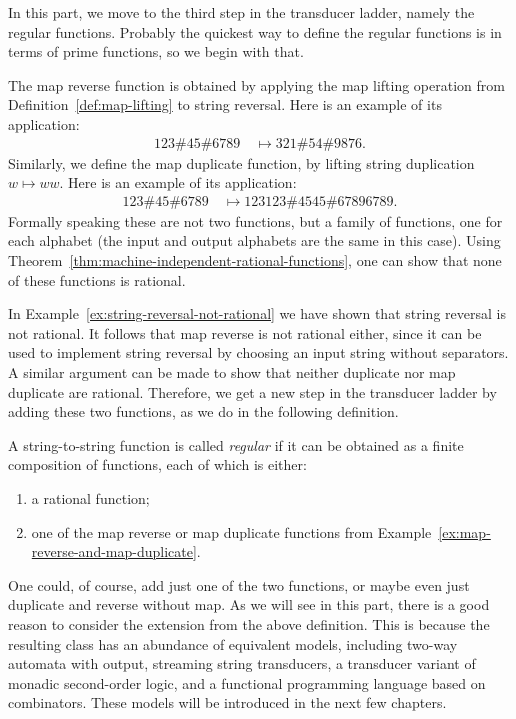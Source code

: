In this part, we move to the third step in the transducer ladder, namely the  regular functions. Probably the quickest way to define the regular functions is in terms of prime functions, so we begin with that. 

\begin{myexample}\label{ex:map-reverse-and-map-duplicate}
    The map reverse function is obtained by applying the map lifting operation from Definition~\ref{def:map-lifting} to string reversal. Here is an example of its application:
    \begin{align*}
    123 \# 45 \# 6789 \quad \mapsto 321 \# 54 \# 9876.
    \end{align*}
    Similarly, we define the map duplicate function, by lifting string duplication $w \mapsto ww$. Here is an example of its application:
    \begin{align*}
    123 \# 45 \# 6789 \quad \mapsto 123123 \# 4545 \# 67896789.
    \end{align*}
    Formally speaking these are not two functions, but a family of functions, one for each alphabet (the input and output alphabets are the same in this case). Using Theorem~\ref{thm:machine-independent-rational-functions}, one can show that none of these functions is rational. 
\end{myexample}

In Example~\ref{ex:string-reversal-not-rational} we have shown that string reversal is not rational. It follows that map reverse is not rational either, since it can be used to implement string reversal by choosing an input string without separators. A similar argument can be made to show that neither duplicate nor map duplicate are rational. Therefore, we get a new step in the transducer ladder by adding these two functions, as we do in the following definition.

\begin{definition}\label{def:regular-functions}
    A string-to-string function is called \emph{regular} if it can be obtained as a finite composition of functions, each of which is either:
    \begin{enumerate}
        \item a rational function;
        \item one of the map reverse or map duplicate functions from Example~\ref{ex:map-reverse-and-map-duplicate}.
    \end{enumerate}
\end{definition}

One could, of course, add just one of the two functions, or maybe even just duplicate and reverse without map. As we will see in this part, there is a good reason to consider the extension from the above definition. This is because the resulting class has an  abundance of equivalent models, including two-way automata with output, streaming string transducers, a transducer variant of monadic second-order logic, and a functional programming language based on combinators. These models will be introduced in the next few chapters. 



